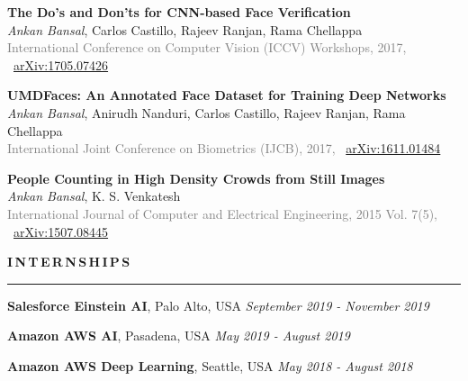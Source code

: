 \documentclass[11pt, a4paper]{article}
\begin{document}
\vspace{4pt}

\textbf{The Do's and Don'ts for CNN-based Face Verification} \\
\textit{Ankan Bansal}, Carlos Castillo, Rajeev Ranjan, Rama Chellappa\\
\textcolor{gray}{International Conference on Computer Vision (ICCV) Workshops, 2017,} ~\href{https://arxiv.org/abs/1705.07426}{arXiv:1705.07426}

\vspace{4pt}

\textbf{UMDFaces: An Annotated Face Dataset for Training Deep Networks} \\
\textit{Ankan Bansal}, Anirudh Nanduri, Carlos Castillo, Rajeev Ranjan, Rama Chellappa\\
\textcolor{gray}{International Joint Conference on Biometrics (IJCB), 2017,} ~\href{https://arxiv.org/abs/1611.01484}{arXiv:1611.01484}

\vspace{4pt}

\textbf{People Counting in High Density Crowds from Still Images} \\
\textit{Ankan Bansal}, K. S. Venkatesh\\
\textcolor{gray}{International Journal of Computer and Electrical Engineering, 2015 Vol. 7(5),} ~\href{https://arxiv.org/abs/1507.08445}{arXiv:1507.08445}

\vspace{5pt}

\textbf{I\,N\,T\,E\,R\,N\,S\,H\,I\,P\,S}
\vspace{5pt}
\hrule
\vspace{7pt}

\textbf{Salesforce Einstein AI}, Palo Alto, USA \hfill \textit{September 2019 - November 2019}

\vspace{2pt}

\textbf{Amazon AWS AI}, Pasadena, USA \hfill \textit{May 2019 - August 2019}

\vspace{2pt}

\textbf{Amazon AWS Deep Learning}, Seattle, USA \hfill \textit{May 2018 - August 2018} 
\end{document}
